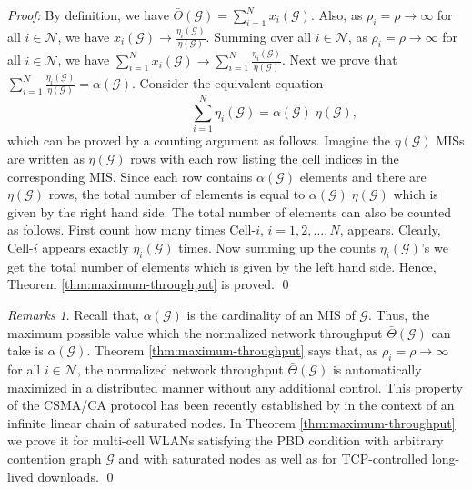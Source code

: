 \documentclass[10pt,a4paper,journal]{IEEEtran}
\theoremstyle{definition}
\theoremstyle{remark}
\newtheorem{remark}{Remarks}[section] \newtheorem{discussion}{Discussion}[section] \newtheorem{example}{Example}[section]
\theoremstyle{plain}
\begin{document}
\textit{Proof:} By definition, we have $\bar{\Theta}(\mathcal{G}) = \sum_{i=1}^N x_i(\mathcal{G})$. Also, as $\rho_i = \rho \longrightarrow \infty$ for all $i \in \mathcal{N}$, we have $x_i(\mathcal{G}) \longrightarrow \frac{\eta_i(\mathcal{G})}{\eta(\mathcal{G})}$. Summing over all $i \in \mathcal{N}$, as $\rho_i = \rho \longrightarrow \infty$ for all $i \in \mathcal{N}$, we have $\sum_{i=1}^N x_i(\mathcal{G}) \longrightarrow \sum_{i=1}^N \frac{\eta_i(\mathcal{G})}{\eta(\mathcal{G})}$. Next we prove that $\sum_{i=1}^N \frac{\eta_i(\mathcal{G})}{\eta(\mathcal{G})} = \alpha(\mathcal{G})$. Consider the equivalent equation 
\[\quad \quad \quad \quad \quad \quad \sum_{i=1}^N \eta_i(\mathcal{G}) = \alpha(\mathcal{G}) \; \eta(\mathcal{G}),\] 
which can be proved by a counting argument as follows. Imagine the $\eta(\mathcal{G})$ MISs are written as $\eta(\mathcal{G})$ rows with each row listing the cell indices in the corresponding MIS. Since each row contains $\alpha(\mathcal{G})$ elements and there are $\eta(\mathcal{G})$ rows, the total number of elements is equal to $\alpha(\mathcal{G}) \; \eta(\mathcal{G})$ which is given by the right hand side. The total number of elements can also be counted as follows. First count how many times Cell-$i$, $i = 1, 2, \ldots, N$, appears. Clearly, Cell-$i$ appears exactly $\eta_i(\mathcal{G})$ times. Now summing up the counts $\eta_i(\mathcal{G})$'s we get the total number of elements which is given by the left hand side. Hence, Theorem \ref{thm:maximum-throughput} is proved. \hfill \qed



\begin{remark}
\label{rmk:maximum-network-throughput}
Recall that, $\alpha(\mathcal{G})$ is the cardinality of an MIS of $\mathcal{G}$. Thus, the maximum possible value which the normalized network throughput $\bar{\Theta}(\mathcal{G})$ can take is $\alpha(\mathcal{G})$. Theorem \ref{thm:maximum-throughput} says that, as $\rho_i = \rho \longrightarrow \infty$ for all $i \in \mathcal{N}$, the normalized network throughput $\bar{\Theta}(\mathcal{G})$ is automatically maximized in a distributed manner without any additional control. This property of the CSMA/CA protocol has been recently established by \cite{wanet.durvy09selfOrganization} in the context of an infinite linear chain of saturated nodes. In Theorem \ref{thm:maximum-throughput} we prove it for multi-cell WLANs satisfying the PBD condition with arbitrary contention graph $\mathcal{G}$ and with saturated nodes as well as for TCP-controlled long-lived downloads. \hfill \qed
\end{remark}
\end{document}
